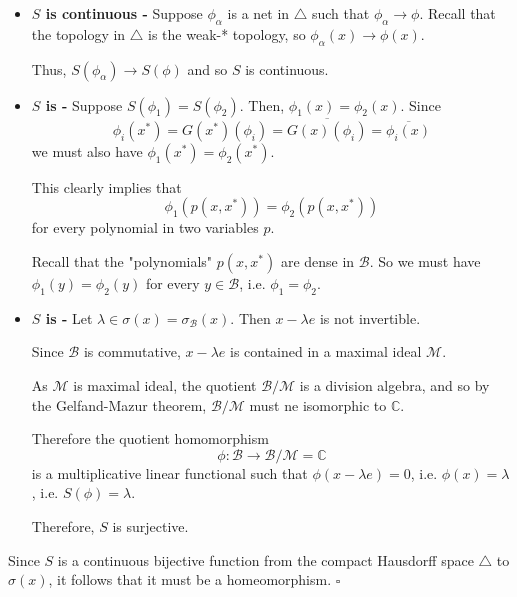 \documentclass[12pt]{article}
\begin{document}
\begin{itemize}
\item {\bf $S$ is continuous -} Suppose $\phi_{\alpha}$ is a net in $\bigtriangleup$ such that $\phi_{\alpha} \longrightarrow \phi$. Recall that the topology in $\bigtriangleup$ is the weak-* topology, so $\phi_{\alpha}(x) \longrightarrow \phi(x)$.

Thus, $S(\phi_{\alpha}) \longrightarrow S(\phi)$ and so $S$ is continuous.

\item {\bf $S$ is  -} Suppose $S(\phi_1) = S(\phi_2)$. Then, $ \phi_1(x) = \phi_2(x)$. Since 
\begin{displaymath}
\phi_i(x^*)=G(x^*)(\phi_i) = \overline{G(x)(\phi_i)}=\overline{\phi_i(x)}
\end{displaymath}
we must also have $\phi_1(x^*)=\phi_2(x^*)$.

This clearly implies that
\begin{displaymath}
\phi_1(p(x,x^*))= \phi_2(p(x,x^*))
\end{displaymath}
for every polynomial in two variables $p$.

Recall that the "polynomials" $p(x,x^*)$ are dense in $\mathcal{B}$. So we must have $\phi_1(y)=\phi_2(y)$ for every $y \in \mathcal{B}$, i.e. $\phi_1 = \phi_2$.

\item {\bf $S$ is  -} Let $\lambda \in \sigma(x) = \sigma_{\mathcal{B}}(x)$. Then $x - \lambda e$ is not invertible.

Since $\mathcal{B}$ is commutative, $x - \lambda e$ is contained in a maximal ideal $\mathcal{M}$.

As $\mathcal{M}$ is maximal ideal, the quotient $\mathcal{B}/\mathcal{M}$ is a division algebra, and so by the Gelfand-Mazur theorem, $\mathcal{B}/\mathcal{M}$ must ne isomorphic to $\mathbb{C}$.

Therefore the quotient homomorphism
\begin{displaymath}
\phi : \mathcal{B} \longrightarrow \mathcal{B}/\mathcal{M}=\mathbb{C}
\end{displaymath}
is a multiplicative linear functional such that $\phi(x-\lambda e) = 0$, i.e. $\phi(x) = \lambda$, i.e. $S(\phi) = \lambda$.

Therefore, $S$ is surjective.

\end{itemize}

Since $S$ is a continuous bijective function from the compact Hausdorff space $\bigtriangleup$ to $\sigma(x)$, it follows that it must be a homeomorphism. $\square$
\end{document}
